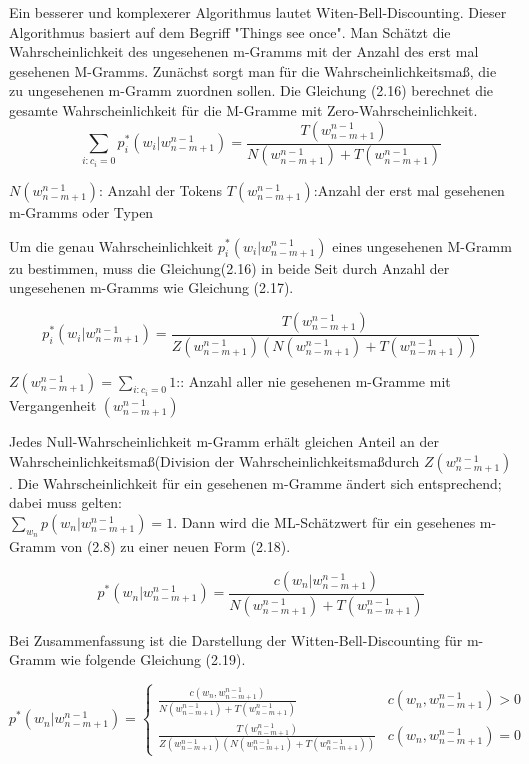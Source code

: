 Ein besserer und komplexerer Algorithmus lautet Witen-Bell-Discounting.
Dieser Algorithmus basiert auf dem Begriff "Things see once". Man Sch\"atzt die Wahrscheinlichkeit des ungesehenen m-Gramms mit der Anzahl des erst mal gesehenen M-Gramms. Zun\"achst sorgt man f\"ur die Wahrscheinlichkeitsma\ss , die zu ungesehenen m-Gramm zuordnen sollen. Die Gleichung (2.16) berechnet die  gesamte Wahrscheinlichkeit f\"ur  die M-Gramme mit Zero-Wahrscheinlichkeit.
\begin{equation}
\label{equation:witten_bell_01}
\sum_{i:c_{i}=0}p_{i}^{*}(w_{i}|w_{n-m+1}^{n-1})=\frac{T(w_{n-m+1}^{n-1})}{N(w_{n-m+1}^{n-1})+T(w_{n-m+1}^{n-1})}
\end{equation}

$N(w_{n-m+1}^{n-1})$: Anzahl der Tokens
$T(w_{n-m+1}^{n-1})$:Anzahl der erst mal gesehenen m-Gramms oder Typen

Um die genau Wahrscheinlichkeit $p_{i}^{*}(w_{i}|w_{n-m+1}^{n-1})$ eines ungesehenen M-Gramm zu bestimmen, muss die Gleichung(2.16) in beide Seit durch Anzahl der ungesehenen m-Gramms wie Gleichung (2.17).

\begin{equation}
\label{equation:witten_bell_02}
p_{i}^{*}(w_{i}|w_{n-m+1}^{n-1})=\frac{T(w_{n-m+1}^{n-1})}{Z(w_{n-m+1}^{n-1})(N(w_{n-m+1}^{n-1})+T(w_{n-m+1}^{n-1}))}
\end{equation}

$Z(w_{n-m+1}^{n-1})=\sum_{i:c_{i}=0}1$:: Anzahl aller nie gesehenen m-Gramme mit Vergangenheit $(w_{n-m+1}^{n-1})$

Jedes Null-Wahrscheinlichkeit m-Gramm erh\"alt gleichen Anteil an der Wahrscheinlichkeitsma\ss (Division der Wahrscheinlichkeitsma\ss durch $Z(w_{n-m+1}^{n-1})$.
Die Wahrscheinlichkeit f\"ur ein gesehenen m-Gramme \"andert sich entsprechend; dabei muss gelten:\\ 
$\sum_{w_{n}}p(w_{n}|w_{n-m+1}^{n-1})=1$. Dann wird die ML-Sch\"atzwert  f\"ur ein gesehenes m-Gramm von (2.8) zu einer neuen Form (2.18). 

\begin{equation}
\label{equation:witten_bell_03}
p^{*}(w_{n}|w_{n-m+1}^{n-1})=\frac{c(w_{n}|w_{n-m+1}^{n-1})}{N(w_{n-m+1}^{n-1})+T(w_{n-m+1}^{n-1})}
\end{equation}

Bei Zusammenfassung ist die Darstellung der Witten-Bell-Discounting f\"ur m-Gramm wie folgende Gleichung (2.19).

\begin{equation}
\label{equationo:witten_bell_04}
p^{*}(w_{n}|w_{n-m+1}^{n-1})=\begin{cases}
\frac{c(w_{n},w_{n-m+1}^{n-1})}{N(w_{n-m+1}^{n-1})+T(w_{n-m+1}^{n-1})} & c(w_{n},w_{n-m+1}^{n-1})>0 \\
\frac{T(w_{n-m+1}^{n-1})}{Z(w_{n-m+1}^{n-1})(N(w_{n-m+1}^{n-1})+T(w_{n-m+1}^{n-1}))} & c(w_{n},w_{n-m+1}^{n-1})=0 
\end{cases}
\end{equation}
